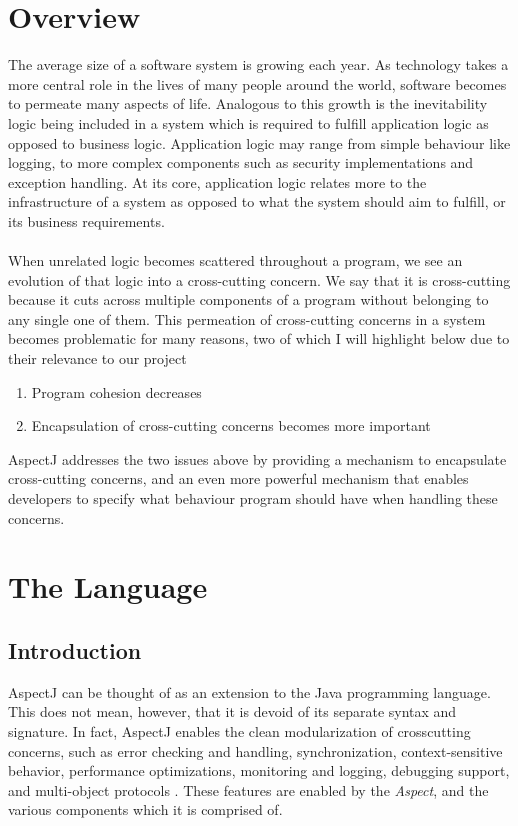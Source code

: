 \documentclass[sigconf]{acmart}
\begin{document}
\section{Overview}
The average size of a software system is growing each year. As technology takes a more central role in the lives of many people around the world, software becomes to permeate many aspects of life. Analogous to this growth is the inevitability logic being included in a system which is required to fulfill application logic as opposed to business logic. Application logic may range from simple behaviour like logging, to more complex components such as security implementations and exception handling. At its core, application logic relates more to the infrastructure of a system as opposed to what the system should aim to fulfill, or its business requirements. 
\\
\\
When unrelated logic becomes scattered throughout a program, we see an evolution of that logic into a cross-cutting concern. We say that it is cross-cutting because it cuts across multiple components of a program without belonging to any single one of them. This permeation of cross-cutting concerns in a system becomes problematic for many reasons, two of which I will highlight below due to their relevance to our project
\begin{enumerate}
    \item Program cohesion decreases
    \item Encapsulation of cross-cutting concerns becomes more important
\end{enumerate}
AspectJ addresses the two issues above by providing a mechanism to encapsulate cross-cutting concerns, and an even more powerful mechanism that enables developers to specify what behaviour program should have when handling these concerns.

\section{The Language}
\subsection{Introduction}
AspectJ can be thought of as an extension to the Java programming language. This does not mean, however, that it is devoid of its separate syntax and signature. In fact, AspectJ enables the clean modularization of crosscutting concerns, such as error checking and handling, synchronization, context-sensitive behavior, performance optimizations, monitoring and logging, debugging support, and multi-object protocols \cite{EclipseFoundation}. These features are enabled by the \textit{Aspect}, and the various components which it is comprised of.
\end{document}
